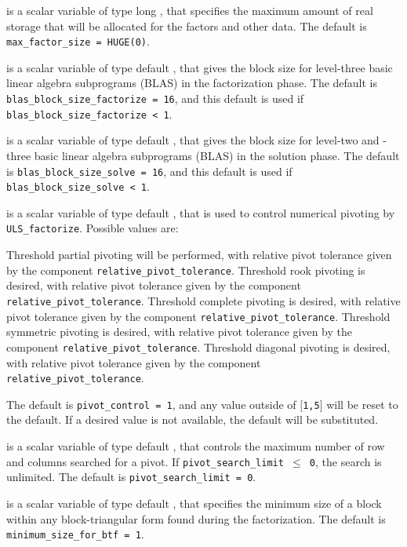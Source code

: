 \documentclass{galahad}
\newcommand{\packagename}{ULS}
\begin{document}
\begin{description}
 is a scalar variable of type long \integer,
that specifies the maximum amount of real storage that will be 
allocated for the factors and other data.
The default is {\tt max\_factor\_size = HUGE(0)}.

 is a scalar variable of type default \integer,
that gives the block size for level-three basic linear algebra subprograms
(BLAS) in the factorization phase.
The default is {\tt blas\_block\_size\_factorize = 16},
and this default is used if {\tt blas\_block\_size\_factorize < 1}.

 is a scalar variable of type default \integer,
that gives the block size for level-two and -three basic linear algebra 
subprograms (BLAS) in the solution phase.
The default is {\tt blas\_block\_size\_solve = 16},
and this default is used if {\tt blas\_block\_size\_solve < 1}.

 is a scalar variable of type default \integer,
that is used to control numerical pivoting by {\tt \packagename\_\-factorize}. 
Possible values are: 
\begin{description} 
   Threshold partial pivoting will be performed, with relative pivot  
     tolerance given by the component {\tt relative\_\-pivot\_tolerance}.  
   Threshold rook pivoting is desired, with relative pivot  
     tolerance given by the component {\tt relative\_\-pivot\_\-tolerance}.  
   Threshold complete pivoting is desired, with relative pivot  
     tolerance given by the component {\tt relative\_\-pivot\_tolerance}.  
   Threshold symmetric pivoting is desired, with relative pivot  
     tolerance given by the component {\tt relative\_\-pivot\_tolerance}.  
   Threshold diagonal pivoting is desired, with relative pivot  
     tolerance given by the component {\tt relative\_\-pivot\_tolerance}.  
\end{description} 
The default is {\tt pivot\_control = 1}, and any value outside of 
$[${\tt1,5}$]$ will be reset to the default. If a desired value
is not available, the default will be substituted.

 is a scalar variable of type default \integer,
that controls the maximum number of row and columns searched for a pivot.
If {\tt pivot\_search\_\-limit $\leq$ 0}, the search is unlimited.
The default is {\tt pivot\_search\_\-limit = 0}.

 is a scalar variable of type default \integer,
that specifies the minimum size of a block within any block-triangular
form found during the factorization.
The default is {\tt minimum\_size\_for\_btf = 1}.


\end{description}
\end{document}
